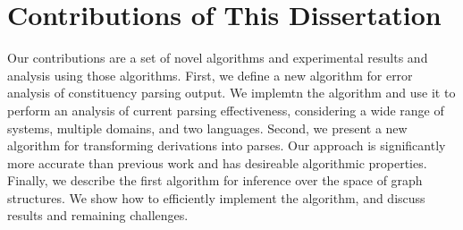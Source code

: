 \section{Contributions of This Dissertation}

Our contributions are a set of novel algorithms and experimental results and analysis using those algorithms.
First, we define a new algorithm for error analysis of constituency parsing output.
We implemtn the algorithm and use it to perform an analysis of current parsing effectiveness, considering a wide range of systems, multiple domains, and two languages.
Second, we present a new algorithm for transforming \ccg derivations into \gb parses.
Our approach is significantly more accurate than previous work and has desireable algorithmic properties.
Finally, we describe the first algorithm for inference over the space of \gb graph structures.
We show how to efficiently implement the algorithm, and discuss results and remaining challenges.

